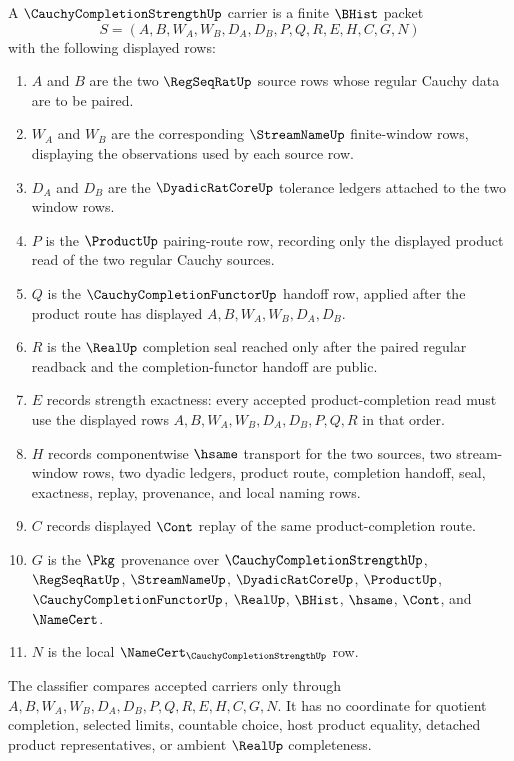 \begin{definition}
\label{def:cauchy-completion-strength-carrier}
A $\CauchyCompletionStrengthUp$ carrier is a finite $\BHist$ packet
$$
S=(A,B,W_A,W_B,D_A,D_B,P,Q,R,E,H,C,G,N)
$$
with the following displayed rows:
\begin{enumerate}
\item $A$ and $B$ are the two $\RegSeqRatUp$ source rows whose regular Cauchy data are to be paired.
\item $W_A$ and $W_B$ are the corresponding $\StreamNameUp$ finite-window rows, displaying the observations used by each source row.
\item $D_A$ and $D_B$ are the $\DyadicRatCoreUp$ tolerance ledgers attached to the two window rows.
\item $P$ is the $\ProductUp$ pairing-route row, recording only the displayed product read of the two regular Cauchy sources.
\item $Q$ is the $\CauchyCompletionFunctorUp$ handoff row, applied after the product route has displayed $A,B,W_A,W_B,D_A,D_B$.
\item $R$ is the $\RealUp$ completion seal reached only after the paired regular readback and the completion-functor handoff are public.
\item $E$ records strength exactness: every accepted product-completion read must use the displayed rows $A,B,W_A,W_B,D_A,D_B,P,Q,R$ in that order.
\item $H$ records componentwise $\hsame$ transport for the two sources, two stream-window rows, two dyadic ledgers, product route, completion handoff, seal, exactness, replay, provenance, and local naming rows.
\item $C$ records displayed $\Cont$ replay of the same product-completion route.
\item $G$ is the $\Pkg$ provenance over $\CauchyCompletionStrengthUp$, $\RegSeqRatUp$, $\StreamNameUp$, $\DyadicRatCoreUp$, $\ProductUp$, $\CauchyCompletionFunctorUp$, $\RealUp$, $\BHist$, $\hsame$, $\Cont$, and $\NameCert$.
\item $N$ is the local $\NameCert_{\CauchyCompletionStrengthUp}$ row.
\end{enumerate}
The classifier compares accepted carriers only through $A,B,W_A,W_B,D_A,D_B,P,Q,R,E,H,C,G,N$. It has no coordinate for quotient completion, selected limits, countable choice, host product equality, detached product representatives, or ambient $\RealUp$ completeness.
\end{definition}

